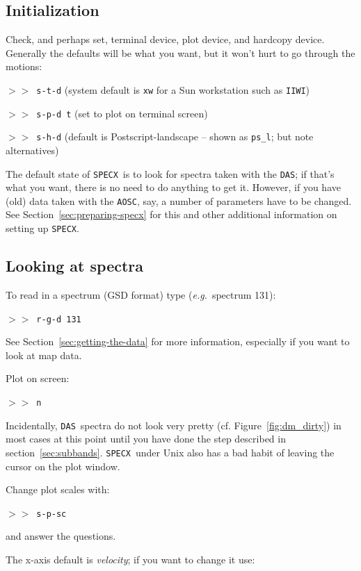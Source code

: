 \documentclass[11pt,twoside]{starlink}
\providecommand{\eg}{\textit{e.g.}}
\providecommand{\SPECX}{\texttt{SPECX}}
\providecommand{\das}{\texttt{DAS}}
\providecommand{\aosc}{\texttt{AOSC}}
\providecommand{\margnote}[1]
{\marginpar{({\it{\ref{#1}}})}}
\providecommand{\SP}{{$>\!>$}}
\begin{document}
\subsection{Initialization}
\label{sec:specx-init}
\margnote{sec:preparing-specx}
Check, and perhaps set, terminal device,
plot device, and hardcopy device. Generally the defaults will be what
you want, but it won't hurt to go through the motions:

\SP\ {\tt{s-t-d}} \hspace*{0.5in}(system default is {\tt{xw}} for a
Sun workstation such as {\tt{IIWI}})

\SP\ {\tt{s-p-d t}} \hspace*{0.35in}(set to plot on terminal screen)

\SP\ {\tt{s-h-d}} \hspace*{0.5in}(default is Postscript-landscape --
shown as {\verb|ps_l|}; but note alternatives)

The default state of \SPECX\ is to look for spectra taken with the
\das ; if that's what you want, there is no need to do anything to get
it. However, if you have (old) data taken with the \aosc , say, a
number of parameters have to be changed. See
Section~\ref{sec:preparing-specx} for this and other additional
information on setting up \SPECX .

\normalmarginpar
\subsection{Looking at spectra}
To read in a spectrum (GSD format)\margnote{sec:getting-the-data} type
(\eg\ spectrum 131):

\SP\ {\tt{r-g-d 131}}

See Section~\ref{sec:getting-the-data} for more information,
especially if you want to look at map data.

Plot on screen:

\SP\ {\tt{n}}

Incidentally, \das\ spectra do not look very pretty (cf.
Figure~\ref{fig:dm_dirty}) in most cases at this point until you have
done the step described in section~\ref{sec:subbands}. \SPECX\ under
Unix also has a bad habit of leaving the cursor on the plot window.

Change plot scales\margnote{sec:specx_5.1} with:

\SP\ {\tt{s-p-sc}}

and answer the questions.

The x-axis default is {\it{velocity}}; if you want to change it
use\margnote{sec:set-x}:
\end{document}
